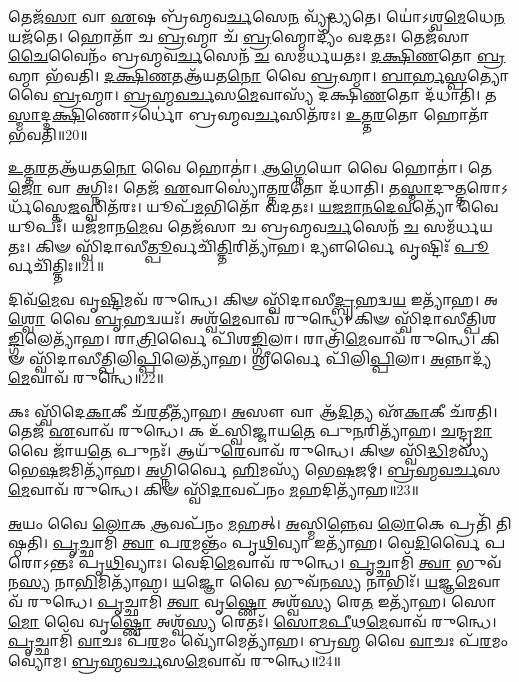 𑌤𑍇𑌜᳴\-\ul{𑌸𑌾} 𑌵𑌾 \ul{𑌏}\-𑌷 𑌬𑍍𑌰᳴𑌹𑍍𑌮𑌵\-\ul{𑌰𑍍𑌚}\-𑌸𑍇\-\ul{𑌨} 𑌵𑍍𑌯𑍃᳴𑌦𑍍𑌧𑍍𑌯𑌤𑍇।
𑌯𑍋॑𑌽𑌶𑍍𑌵\-\ul{𑌮𑍇}\-𑌧𑍇\-\ul{𑌨} 𑌯𑌜᳴𑌤𑍇।
𑌹𑍋𑌤𑌾᳴ 𑌚 \ul{𑌬𑍍𑌰}\-𑌹𑍍𑌮𑌾 𑌚᳴ \ul{𑌬𑍍𑌰}\-𑌹𑍍𑌮𑍋𑌦𑍍𑌯𑌂᳴ 𑌵𑌦𑌤𑌃।
𑌤𑍇𑌜᳴𑌸𑌾 \ul{𑌚𑍈}\-𑌵𑍈𑌨𑌂᳴ 𑌬𑍍𑌰𑌹𑍍𑌮𑌵\-\ul{𑌰𑍍𑌚}\-𑌸𑍇𑌨᳴ \ul{𑌚} 𑌸𑌮᳴𑌰𑍍𑌧𑌯𑌤𑌃।
\-\ul{𑌦}\-\-\ul{𑌕𑍍𑌷𑌿}\-\-\ul{𑌣}\-𑌤𑍋 \ul{𑌬𑍍𑌰}\-𑌹𑍍𑌮𑌾 𑌭᳴𑌵𑌤𑌿।
\-\ul{𑌦}\-\-\ul{𑌕𑍍𑌷𑌿}\-\-\ul{𑌣}\-𑌤𑌆᳴𑌯𑌤\-\ul{𑌨𑍋} 𑌵𑍈 \ul{𑌬𑍍𑌰}\-𑌹𑍍𑌮𑌾।
\-\ul{𑌬𑌾}\-\-\ul{𑌰𑍍}\-\-\ul{𑌹}\-\-\ul{𑌸𑍍𑌪}\-𑌤𑍍𑌯𑍋 𑌵𑍈 \ul{𑌬𑍍𑌰}\-𑌹𑍍𑌮𑌾।
\-\ul{𑌬𑍍𑌰}\-\-\ul{𑌹𑍍𑌮}\-\-\ul{𑌵}\-\-\ul{𑌰𑍍𑌚}\-𑌸\-\ul{𑌮𑍇}\-𑌵𑌾𑌸𑍍𑌯᳴ 𑌦𑌕𑍍𑌷𑌿\-\ul{𑌣}\-𑌤𑍋 𑌦᳴𑌧𑌾𑌤𑌿।
𑌤\-\ul{𑌸𑍍𑌮𑌾}\-𑌦𑍍𑌦\-\ul{𑌕𑍍𑌷𑌿}\-𑌣𑍋\-𑌽𑌰𑍍𑌧𑍋॑ 𑌬𑍍𑌰𑌹𑍍𑌮𑌵\-\ul{𑌰𑍍𑌚}\-𑌸𑌿𑌤᳴𑌰𑌃।
\-\ul{𑌉}\-\-\ul{𑌤𑍍𑌤}\-\-\ul{𑌰}\-𑌤𑍋 𑌹𑍋𑌤𑌾᳴ 𑌭𑌵𑌤𑌿॥20॥

\-\ul{𑌉}\-\-\ul{𑌤𑍍𑌤}\-\-\ul{𑌰}\-𑌤𑌆᳴𑌯𑌤\-\ul{𑌨𑍋} 𑌵𑍈 𑌹𑍋𑌤𑌾॑।
\-\ul{𑌆}\-\-\ul{𑌗𑍍𑌨𑍇}\-𑌯𑍋 𑌵𑍈 𑌹𑍋𑌤𑌾॑।
𑌤𑍇\-\ul{𑌜𑍋} 𑌵𑌾 \ul{𑌅}\-𑌗𑍍𑌨𑌿𑌃।
𑌤𑍇𑌜᳴ \ul{𑌏}\-𑌵𑌾𑌸𑍍𑌯𑍋॑𑌤𑍍𑌤\-\ul{𑌰}\-𑌤𑍋 𑌦᳴𑌧𑌾𑌤𑌿।
𑌤\-\ul{𑌸𑍍𑌮𑌾}\-𑌦𑍁\-\ul{𑌤𑍍𑌤}\-𑌰𑍋\-𑌽𑌰𑍍𑌧᳴𑌸𑍍𑌤𑍇\-\ul{𑌜}\-𑌸𑍍𑌵𑌿𑌤᳴𑌰𑌃।
𑌯𑍂𑌪᳴\-\ul{𑌮}\-𑌭𑌿𑌤𑍋᳴ 𑌵𑌦𑌤𑌃।
\-\ul{𑌯}\-\-\ul{𑌜}\-\-\ul{𑌮𑌾}\-\-\ul{𑌨}\-\-\ul{𑌦𑍇}\-\-\ul{𑌵}\-𑌤𑍍𑌯𑍋᳴ 𑌵𑍈 𑌯𑍂𑌪𑌃᳴।
𑌯𑌜᳴𑌮𑌾𑌨\-\ul{𑌮𑍇}\-𑌵 𑌤𑍇𑌜᳴𑌸𑌾 𑌚 𑌬𑍍𑌰𑌹𑍍𑌮𑌵\-\ul{𑌰𑍍𑌚}\-𑌸𑍇𑌨᳴ \ul{𑌚} 𑌸𑌮᳴𑌰𑍍𑌧𑌯𑌤𑌃।
𑌕𑌿𑍟 𑌸𑍍𑌵𑌿᳴𑌦𑌾𑌸𑍀\-\ul{𑌤𑍍𑌪𑍂}\-𑌰𑍍𑌵𑌚𑌿᳴\-\ul{𑌤𑍍𑌤𑌿}\-𑌰𑌿𑌤𑍍𑌯𑌾᳴𑌹।
𑌦𑍍𑌯𑍗𑌰𑍍𑌵𑍈 𑌵𑍃𑌷𑍍𑌟𑌿𑌃᳴ \ul{𑌪𑍂}\-𑌰𑍍𑌵𑌚𑌿᳴𑌤𑍍𑌤𑌿𑌃॥21॥

𑌦𑌿𑌵᳴\-\ul{𑌮𑍇}\-𑌵 𑌵𑍃\-\ul{𑌷𑍍𑌟𑌿}\-𑌮𑌵᳴ 𑌰𑍁𑌨𑍍𑌧𑍇।
𑌕𑌿𑍟 𑌸𑍍𑌵𑌿᳴𑌦𑌾𑌸𑍀\-\ul{𑌦𑍍𑌬𑍃}\-𑌹𑌦𑍍𑌵\-\ul{𑌯} 𑌇𑌤𑍍𑌯𑌾᳴𑌹।
𑌅\-\ul{𑌶𑍍𑌵𑍋} 𑌵𑍈 \ul{𑌬𑍃}\-𑌹𑌦𑍍𑌵𑌯𑌃᳴।
𑌅𑌶𑍍𑌵᳴\-\ul{𑌮𑍇}\-𑌵𑌾𑌵᳴ 𑌰𑍁𑌨𑍍𑌧𑍇।
𑌕𑌿𑍟 𑌸𑍍𑌵𑌿᳴𑌦𑌾𑌸𑍀𑌤𑍍𑌪𑌿𑌶\-\ul{𑌙𑍍𑌗𑌿}\-𑌲𑍇𑌤𑍍𑌯𑌾᳴𑌹।
𑌰𑌾\-\ul{𑌤𑍍𑌰𑌿}\-𑌰𑍍𑌵𑍈 𑌪𑌿᳴𑌶\-\ul{𑌙𑍍𑌗𑌿}\-𑌲𑌾।
𑌰𑌾𑌤𑍍𑌰𑌿᳴\-\ul{𑌮𑍇}\-𑌵𑌾𑌵᳴ 𑌰𑍁𑌨𑍍𑌧𑍇।
𑌕𑌿𑍟 𑌸𑍍𑌵𑌿᳴𑌦𑌾𑌸𑍀𑌤𑍍𑌪𑌿𑌲𑌿\-\ul{𑌪𑍍𑌪𑌿}\-𑌲𑍇\-𑌤𑍍𑌯𑌾᳴𑌹।
𑌶𑍍𑌰𑍀𑌰𑍍𑌵𑍈 𑌪𑌿᳴𑌲𑌿\-\ul{𑌪𑍍𑌪𑌿}\-𑌲𑌾।
\-\ul{𑌅}\-𑌨𑍍𑌨𑌾𑌦𑍍𑌯᳴\-\ul{𑌮𑍇}\-𑌵𑌾𑌵᳴ 𑌰𑍁𑌨𑍍𑌧𑍇॥22॥

𑌕𑌃 𑌸𑍍𑌵𑌿᳴𑌦𑍇\-\ul{𑌕𑌾}\-𑌕𑍀 𑌚᳴\-\ul{𑌰}\-𑌤𑍀𑌤𑍍𑌯𑌾᳴𑌹।
\-\ul{𑌅}\-𑌸𑍗 𑌵𑌾 𑌆᳴\-\ul{𑌦𑌿}\-𑌤𑍍𑌯 𑌏᳴\-\ul{𑌕𑌾}\-𑌕𑍀 𑌚᳴𑌰𑌤𑌿।
𑌤𑍇𑌜᳴ \ul{𑌏}\-𑌵𑌾𑌵᳴ 𑌰𑍁𑌨𑍍𑌧𑍇।
𑌕 𑌉᳴𑌸𑍍𑌵𑌿𑌜𑍍𑌜𑌾𑌯\-\ul{𑌤𑍇} 𑌪𑍁\-\ul{𑌨}\-𑌰𑌿𑌤𑍍𑌯𑌾᳴𑌹।
\-\ul{𑌚}\-𑌨𑍍𑌦𑍍𑌰\-\ul{𑌮𑌾} 𑌵𑍈 𑌜𑌾᳴𑌯\-\ul{𑌤𑍇} 𑌪𑍁𑌨𑌃᳴।
𑌆𑌯𑍁᳴\-\ul{𑌰𑍇}\-𑌵𑌾𑌵᳴ 𑌰𑍁𑌨𑍍𑌧𑍇।
𑌕𑌿𑍟 𑌸𑍍𑌵𑌿᳴\-\ul{𑌦𑍍𑌧𑌿}\-𑌮𑌸𑍍𑌯᳴ 𑌭𑍇\-\ul{𑌷}\-𑌜𑌮𑌿𑌤𑍍𑌯𑌾᳴𑌹।
\-\ul{𑌅}\-𑌗𑍍𑌨𑌿𑌰𑍍𑌵𑍈 \ul{𑌹𑌿}\-𑌮𑌸𑍍𑌯᳴ 𑌭𑍇\-\ul{𑌷}\-𑌜𑌮𑍍।
\-\ul{𑌬𑍍𑌰}\-\-\ul{𑌹𑍍𑌮}\-\-\ul{𑌵}\-\-\ul{𑌰𑍍𑌚}\-𑌸\-\ul{𑌮𑍇}\-𑌵𑌾𑌵᳴ 𑌰𑍁𑌨𑍍𑌧𑍇।
𑌕𑌿𑍟 𑌸𑍍𑌵𑌿᳴\-\ul{𑌦𑌾}\-𑌵𑌪᳴𑌨𑌂 \ul{𑌮}\-𑌹𑌦𑌿𑌤𑍍𑌯𑌾᳴𑌹॥23॥

\-\ul{𑌅}\-𑌯𑌂 𑌵𑍈 \ul{𑌲𑍋}\-𑌕 \ul{𑌆}\-𑌵𑌪᳴𑌨𑌂 \ul{𑌮}\-𑌹𑌤𑍍।
\-\ul{𑌅}\-𑌸𑍍𑌮𑌿\-\ul{𑌨𑍍𑌨𑍇}\-𑌵 \ul{𑌲𑍋}\-𑌕𑍇 𑌪𑍍𑌰𑌤𑌿᳴ 𑌤𑌿𑌷𑍍𑌠𑌤𑌿।
\-\ul{𑌪𑍃}\-𑌚𑍍𑌛𑌾𑌮𑌿᳴ \ul{𑌤𑍍𑌵𑌾} 𑌪\-\ul{𑌰}\-𑌮𑌨𑍍𑌤𑌂᳴ 𑌪𑍃\-\ul{𑌥𑌿}\-𑌵𑍍𑌯𑌾 𑌇𑌤𑍍𑌯𑌾᳴𑌹।
𑌵𑍇\-\ul{𑌦𑌿}\-𑌰𑍍𑌵𑍈 𑌪𑌰𑍋\-𑌽𑌨𑍍𑌤𑌃᳴ 𑌪𑍃\-\ul{𑌥𑌿}\-𑌵𑍍𑌯𑌾𑌃।
𑌵𑍇𑌦𑌿᳴\-\ul{𑌮𑍇}\-𑌵𑌾𑌵᳴ 𑌰𑍁𑌨𑍍𑌧𑍇।
\-\ul{𑌪𑍃}\-𑌚𑍍𑌛𑌾𑌮𑌿᳴ \ul{𑌤𑍍𑌵𑌾} 𑌭𑍁𑌵᳴𑌨\-\ul{𑌸𑍍𑌯} 𑌨𑌾\-\ul{𑌭𑌿}\-𑌮𑌿𑌤𑍍𑌯𑌾᳴𑌹।
\-\ul{𑌯}\-𑌜𑍍𑌞𑍋 𑌵𑍈 𑌭𑍁𑌵᳴𑌨\-\ul{𑌸𑍍𑌯} 𑌨𑌾𑌭𑌿𑌃᳴।
\-\ul{𑌯}\-𑌜𑍍𑌞\-\ul{𑌮𑍇}\-𑌵𑌾𑌵᳴ 𑌰𑍁𑌨𑍍𑌧𑍇।
\-\ul{𑌪𑍃}\-𑌚𑍍𑌛𑌾𑌮𑌿᳴ \ul{𑌤𑍍𑌵𑌾} 𑌵𑍃\-\ul{𑌷𑍍𑌣𑍋} 𑌅𑌶𑍍𑌵᳴\-\ul{𑌸𑍍𑌯} 𑌰𑍇\-\ul{𑌤} 𑌇𑌤𑍍𑌯𑌾᳴𑌹।
𑌸𑍋\-\ul{𑌮𑍋} 𑌵𑍈 𑌵𑍃\-\ul{𑌷𑍍𑌣𑍋} 𑌅𑌶𑍍𑌵᳴\-\ul{𑌸𑍍𑌯} 𑌰𑍇𑌤𑌃᳴।
\-\ul{𑌸𑍋}\-\-\ul{𑌮}\-\-\ul{𑌪𑍀}\-𑌥\-\ul{𑌮𑍇}\-𑌵𑌾𑌵᳴ 𑌰𑍁𑌨𑍍𑌧𑍇।
\-\ul{𑌪𑍃}\-𑌚𑍍𑌛𑌾𑌮𑌿᳴ \ul{𑌵𑌾}\-𑌚𑌃 𑌪᳴\-\ul{𑌰}\-𑌮𑌂 𑌵𑍍𑌯𑍋᳴𑌮𑍇𑌤𑍍𑌯𑌾᳴𑌹।
𑌬𑍍𑌰\-\ul{𑌹𑍍𑌮} 𑌵𑍈 \ul{𑌵𑌾}\-𑌚𑌃 𑌪᳴\-\ul{𑌰}\-𑌮𑌂 𑌵𑍍𑌯𑍋᳴𑌮।
\-\ul{𑌬𑍍𑌰}\-\-\ul{𑌹𑍍𑌮}\-\-\ul{𑌵}\-\-\ul{𑌰𑍍𑌚}\-𑌸\-\ul{𑌮𑍇}\-𑌵𑌾𑌵᳴ 𑌰𑍁𑌨𑍍𑌧𑍇॥24॥\anuvakamend[𑌹𑍋𑌤𑌾᳴ 𑌭𑌵\-\ul{𑌤𑌿} 𑌵𑍈 𑌵𑍃𑌷𑍍𑌟𑌿𑌃᳴ \ul{𑌪𑍂}\-𑌰𑍍𑌵𑌚𑌿᳴𑌤𑍍𑌤𑌿\-\ul{𑌰}\-𑌨𑍍𑌨𑌾𑌦𑍍𑌯᳴\-\ul{𑌮𑍇}\-𑌵𑌾𑌵᳴ 𑌰𑍁𑌨𑍍𑌧𑍇 \ul{𑌮}\-𑌹𑌦𑌿𑌤𑍍𑌯𑌾᳴\-\ul{𑌹} 𑌸𑍋\-\ul{𑌮𑍋} 𑌵𑍈 𑌵𑍃\-\ul{𑌷𑍍𑌣𑍋} 𑌅𑌶𑍍𑌵᳴\-\ul{𑌸𑍍𑌯} 𑌰𑍇𑌤᳴\-\ul{𑌶𑍍𑌚}\-𑌤𑍍𑌵𑌾𑌰𑌿᳴ 𑌚]


